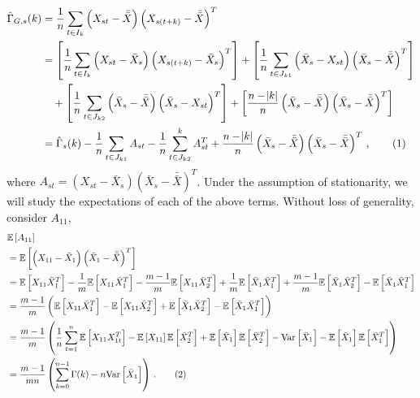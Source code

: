 \documentclass[11pt]{article}
\newcommand{\E}{\mathbb{E}}
\newcommand\numberthis{\addtocounter{equation}{1}\tag{\theequation}}
\theoremstyle{remark}
\begin{document}
\begin{align*}
\hat{\Gamma}_{G,s}(k) & = \dfrac{1}{n}\sum_{t \in I_k} \left(X_{st} - \bar{\bar{X}} \right) \left(X_{s(t+k)} - \bar{\bar{X}} \right)^T \\
    &= \left[\dfrac{1}{n} \sum_{t \in I_k} \left(X_{st} - \bar{X}_s \right) \left(X_{s(t+k)} - \bar{X}_s \right)^T \right] + \left[\dfrac{1}{n} \sum_{t \in J_{k1}}  \left( \bar{X}_s - X_{st} \right)  \left(\bar{X}_s - \bar{\bar{X}} \right)^T\right]\\ 
    & \quad + \left[\dfrac{1}{n} \sum_{t \in J_{k2}} \left(\bar{X}_s - \bar{\bar{X}} \right)  \left(\bar{X}_s - X_{st} \right)^T\right]   + \left[\dfrac{n-\abs{k}}{n} \left(\bar{X}_s - \bar{\bar{X}}\right)   \left(\bar{X}_s - \bar{\bar{X}} \right)^T\right]\\
    &= \hat{\Gamma}_s(k) - \dfrac{1}{n}\sum_{t \in J_{k1}}A_{st} - \dfrac{1}{n} \sum_{t \in J_{k2}}^{k}A_{st}^T  + \dfrac{n-\abs{k}}{n}  \left(\bar{X}_s - \bar{\bar{X}} \right)  \left(\bar{X}_s - \bar{\bar{X}} \right)^T\,, \numberthis \label{eq:acf_breakdown}
\end{align*}
%
where $A_{st} = (X_{st}-\bar{X}_s)(\bar{X}_s - \bar{\bar{X}})^T$. Under the assumption of stationarity, we will study the expectations of each of the above terms. Without loss of generality, consider $A_{11}$,
\begin{align*}
    &\E \left[A_{11} \right]\\
     &= \mathbb{E} \left[ \left(X_{11} - \bar{X}_1 \right) \left(\bar{X}_1 - \bar{\bar{X}} \right)^T \right]\\
    &= \mathbb{E} \left[X_{11}\bar{X}_1^T \right] - \dfrac{1}{m}\mathbb{E} \left[X_{11}\bar{X}_1^T \right] - \dfrac{m-1}{m}\mathbb{E} \left[X_{11}\bar{X}_2^T \right] + \dfrac{1}{m}\mathbb{E} \left[\bar{X}_1\bar{X}_1^T \right] + \dfrac{m-1}{m}\mathbb{E} \left[\bar{X}_1\bar{X}_2^T \right] - \mathbb{E} \left[\bar{X}_1\bar{X}_1^T \right]\\
    &= \dfrac{m-1}{m}\left(\mathbb{E} \left[X_{11}\bar{X}_1^T \right] - \mathbb{E} \left[X_{11}\bar{X}_2^T \right] + \mathbb{E} \left[\bar{X}_1\bar{X}_2^T \right] - \mathbb{E} \left[\bar{X}_1\bar{X}_1^T \right]\right)\\
    &= \dfrac{m-1}{m}\left(\dfrac{1}{n}\sum_{t=1}^{n}\mathbb{E} \left[X_{11}X_{1t}^T \right] - \mathbb{E}\left[X_{11}\right] \mathbb{E}\left[\bar{X}_2^T \right] + \mathbb{E} \left[\bar{X}_1\right]\mathbb{E}\left[\bar{X}_2^T\right] - \text{Var}\left[\bar{X}_1 \right] - \mathbb{E}\left[\bar{X}_1 \right]\mathbb{E}\left[\bar{X}_1^T \right]\right)\\
    &= \dfrac{m-1}{mn}\left(\sum_{k=0}^{n-1}\Gamma(k) - n\text{Var}\left[\bar{X}_1 \right]\right)\,. \numberthis \label{eq:acf_2}
\end{align*}
\end{document}
